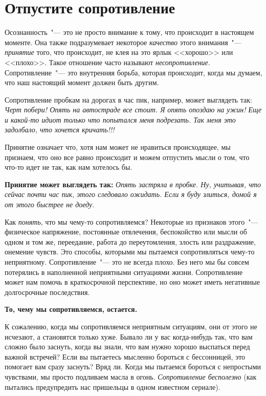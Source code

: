 
\chapter{Отпустите сопротивление}\label{Letting_Go_of_Resistance}

Осознанность~"--- это не просто внимание к тому, что происходит в настоящем моменте. Она также подразумевает некоторое \emph{качество} этого внимания~"--- \emph{принятие} того, что происходит, не клея на это ярлык <<хорошо>> или <<плохо>>. Такое отношение часто называют \emph{несопротивление}. Сопротивление~"--- это внутренняя борьба, которая происходит, когда мы думаем, что наш настоящий момент должен быть другим.

Сопротивление пробкам на дорогах в час пик, например, может выглядеть так: \emph{Черт побери! Опять на автостраде все стоит. Я опять опоздаю на ужин! Еще и какой-то идиот только что попытался меня подрезать. Так меня это задолбало, что хочется кричать!!!}

Принятие означает что, хотя нам может не нравиться происходящее, мы признаем, что оно все равно происходит и можем отпустить мысли о том, что что-то идет не так, как нам хотелось бы.

\textbf{Принятие может выглядеть так:} \emph{Опять застряла в пробке. Ну, учитывая, что сейчас почти час пик, этого следовало ожидать. Если я буду злиться, домой я от этого быстрее не доеду.}

Как \emph{понять}, что мы чему-то сопротивляемся? Некоторые из признаков этого~"--- физическое напряжение, постоянные отвлечения, беспокойство или мысли об одном и том же, переедание, работа до переутомления, злость или раздражение, онемение чувств.  Это способы, которыми мы пытаемся сопротивляться чему-то неприятному. Сопротивление~"--- это не всегда плохо. Без него мы бы совсем потерялись в наполненной неприятными ситуациями жизни. Сопротивление может нам помочь в краткосрочной перспективе, но оно может иметь негативные долгосрочные последствия. 

\begin{center}
	{\large \textbf{То, чему мы сопротивляемся, остается.}}
\end{center}
  
К сожалению, когда мы сопротивляемся неприятным ситуациям, они от этого не исчезают, а становятся только хуже. Бывало ли у вас когда-нибудь так, что вам сложно было заснуть, когда вы знали, что вам нужно хорошо выспаться перед важной встречей? Если вы пытаетесь мысленно бороться с бессонницей, это помогает вам сразу заснуть? Вряд ли. Когда мы пытаемся бороться с непростыми чувствами, мы просто подливаем масла в огонь. \textit{Сопротивление бесполезно} (как пытались предупредить нас пришельцы в одном известном сериале).

